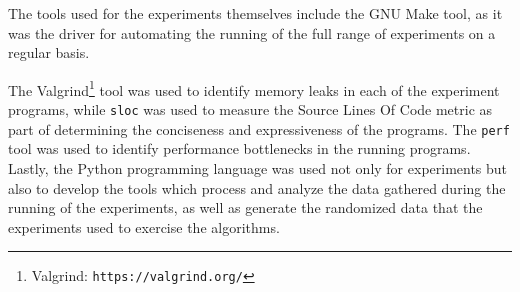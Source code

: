 The tools used for the experiments themselves include the GNU Make tool, as it was the driver for automating the running of the full range of experiments on a regular basis.

The Valgrind\footnote{Valgrind: \texttt{https://valgrind.org/}} tool was used to identify memory leaks in each of the experiment programs, while \texttt{sloc} was used to measure the Source Lines Of Code metric as part of determining the conciseness and expressiveness of the programs. The \texttt{perf} tool was used to identify performance bottlenecks in the running programs. Lastly, the Python programming language was used not only for experiments but also to develop the tools which process and analyze the data gathered during the running of the experiments, as well as generate the randomized data that the experiments used to exercise the algorithms.